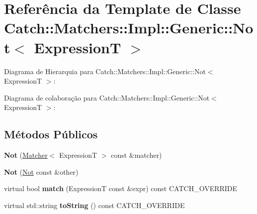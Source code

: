 \hypertarget{classCatch_1_1Matchers_1_1Impl_1_1Generic_1_1Not}{}\section{Referência da Template de Classe Catch\+:\+:Matchers\+:\+:Impl\+:\+:Generic\+:\+:Not$<$ ExpressionT $>$}
\label{classCatch_1_1Matchers_1_1Impl_1_1Generic_1_1Not}


Diagrama de Hierarquia para Catch\+:\+:Matchers\+:\+:Impl\+:\+:Generic\+:\+:Not$<$ ExpressionT $>$\+:


Diagrama de colaboração para Catch\+:\+:Matchers\+:\+:Impl\+:\+:Generic\+:\+:Not$<$ ExpressionT $>$\+:
\subsection*{Métodos Públicos}
\begin{DoxyCompactItemize}
\item 
{\bfseries Not} (\hyperlink{structCatch_1_1Matchers_1_1Impl_1_1Matcher}{Matcher}$<$ ExpressionT $>$ const \&matcher)\hypertarget{classCatch_1_1Matchers_1_1Impl_1_1Generic_1_1Not_a9b99e3ce49c1a16931708b67c312f204}{}\label{classCatch_1_1Matchers_1_1Impl_1_1Generic_1_1Not_a9b99e3ce49c1a16931708b67c312f204}

\item 
{\bfseries Not} (\hyperlink{classCatch_1_1Matchers_1_1Impl_1_1Generic_1_1Not}{Not} const \&other)\hypertarget{classCatch_1_1Matchers_1_1Impl_1_1Generic_1_1Not_a46eccbbaeec259d3536aa2a29f95208f}{}\label{classCatch_1_1Matchers_1_1Impl_1_1Generic_1_1Not_a46eccbbaeec259d3536aa2a29f95208f}

\item 
virtual bool {\bfseries match} (ExpressionT const \&expr) const C\+A\+T\+C\+H\+\_\+\+O\+V\+E\+R\+R\+I\+DE\hypertarget{classCatch_1_1Matchers_1_1Impl_1_1Generic_1_1Not_a18c49fc6fb73a42d54650dafc18c7db1}{}\label{classCatch_1_1Matchers_1_1Impl_1_1Generic_1_1Not_a18c49fc6fb73a42d54650dafc18c7db1}

\item 
virtual std\+::string {\bfseries to\+String} () const C\+A\+T\+C\+H\+\_\+\+O\+V\+E\+R\+R\+I\+DE\hypertarget{classCatch_1_1Matchers_1_1Impl_1_1Generic_1_1Not_ab970a4a6e58a987451e0b0e0e60a0bff}{}\label{classCatch_1_1Matchers_1_1Impl_1_1Generic_1_1Not_ab970a4a6e58a987451e0b0e0e60a0bff}

\end{DoxyCompactItemize}
